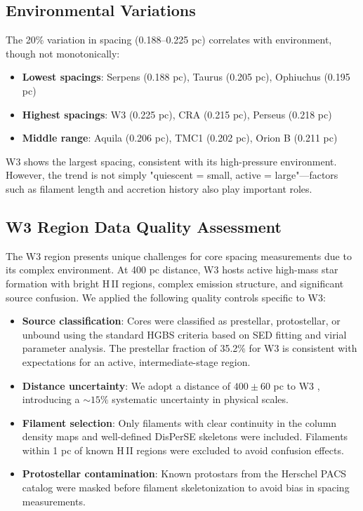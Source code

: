 \documentclass[11pt,a4paper]{article}
\begin{document}
\subsection{Environmental Variations}

The 20\% variation in spacing (0.188--0.225 pc) correlates with environment, though not monotonically:

\begin{itemize}
    \item \textbf{Lowest spacings}: Serpens (0.188 pc), Taurus (0.205 pc), Ophiuchus (0.195 pc)
    \item \textbf{Highest spacings}: W3 (0.225 pc), CRA (0.215 pc), Perseus (0.218 pc)
    \item \textbf{Middle range}: Aquila (0.206 pc), TMC1 (0.202 pc), Orion B (0.211 pc)
\end{itemize}

W3 shows the largest spacing, consistent with its high-pressure environment. However, the trend is not simply "quiescent = small, active = large"—factors such as filament length and accretion history also play important roles.

\subsection{W3 Region Data Quality Assessment}
\label{sec:w3_details}

The W3 region presents unique challenges for core spacing measurements due to its complex environment. At 400 pc distance, W3 hosts active high-mass star formation with bright H\,{\scriptsize II} regions, complex emission structure, and significant source confusion. We applied the following quality controls specific to W3:

\begin{itemize}
    \item \textbf{Source classification}: Cores were classified as prestellar, protostellar, or unbound using the standard HGBS criteria based on SED fitting and virial parameter analysis. The prestellar fraction of 35.2\% for W3 is consistent with expectations for an active, intermediate-stage region.
    \item \textbf{Distance uncertainty}: We adopt a distance of $400 \pm 60$ pc to W3 \citep{Xu2021}, introducing a $\sim15\%$ systematic uncertainty in physical scales.
    \item \textbf{Filament selection}: Only filaments with clear continuity in the column density maps and well-defined DisPerSE skeletons were included. Filaments within 1 pc of known H\,{\scriptsize II} regions were excluded to avoid confusion effects.
    \item \textbf{Protostellar contamination}: Known protostars from the Herschel PACS catalog \citep{Joswig2013} were masked before filament skeletonization to avoid bias in spacing measurements.
\end{itemize}
\end{document}

